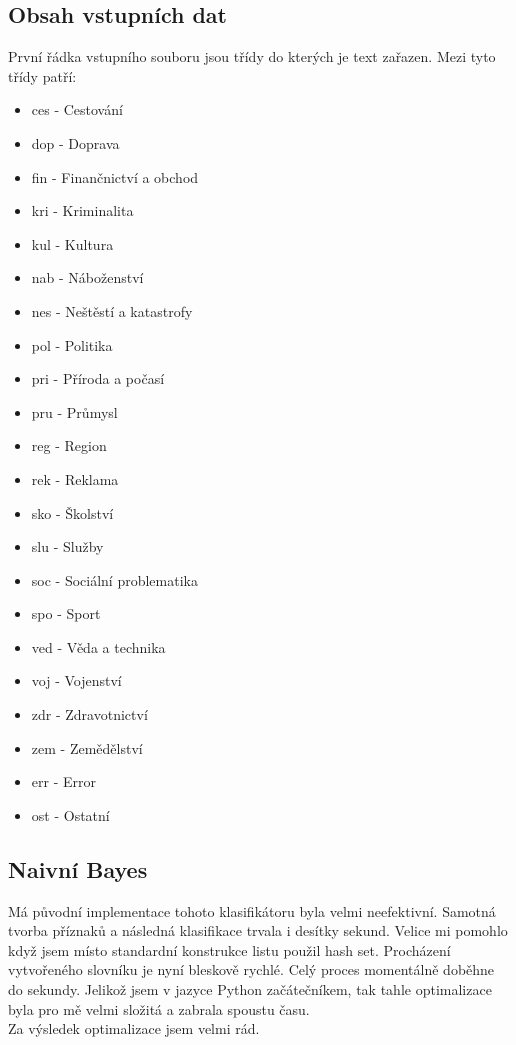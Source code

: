 \documentclass[ 12pt, a4paper]{article}
\begin{document}
\subsection{Obsah vstupních dat}
První řádka vstupního souboru jsou třídy do kterých je text zařazen. Mezi tyto třídy patří:
\begin{itemize}
	\item ces - Cestování
	\item dop - Doprava
	\item fin - Finančnictví a obchod
	\item kri - Kriminalita
	\item kul - Kultura
	\item nab - Náboženství
	\item nes - Neštěstí a katastrofy
	\item pol - Politika
	\item pri - Příroda a počasí
	\item pru - Průmysl
	\item reg - Region
	\item rek - Reklama
	\item sko - Školství
	\item slu - Služby
	\item soc - Sociální problematika
	\item spo - Sport
	\item ved - Věda a technika
	\item voj - Vojenství
	\item zdr - Zdravotnictví
	\item zem - Zemědělství
	\item err - Error
	\item ost - Ostatní
\end{itemize}


\subsection{Naivní Bayes}

Má původní implementace tohoto klasifikátoru byla velmi neefektivní. Samotná tvorba příznaků a následná klasifikace trvala i desítky sekund. Velice mi pomohlo když jsem místo standardní konstrukce listu použil hash set. Procházení vytvořeného slovníku je nyní bleskově rychlé. Celý proces momentálně doběhne do sekundy. Jelikož jsem v jazyce Python začátečníkem, tak tahle optimalizace byla pro mě velmi složitá a zabrala spoustu času.\\ Za výsledek optimalizace jsem velmi rád.
\end{document}
